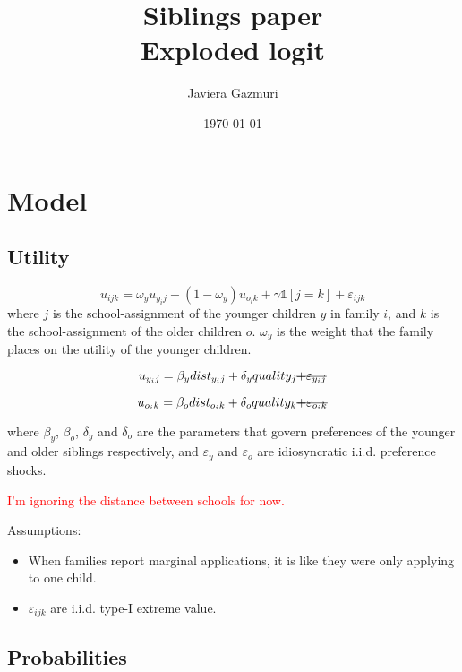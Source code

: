 \documentclass{article}
\title{\textbf{Siblings paper} \\ Exploded logit}
\author{Javiera Gazmuri}
\date{\today}
\newcommand{\stkout}[1]{\ifmmode\text{\sout{\ensuremath{#1}}}\else\sout{#1}\fi}
\begin{document}
\maketitle


\section{Model}

\subsection{Utility}

\begin{equation}
    u_{ijk} = \omega_{y} u_{y_ij} + (1-\omega_{y})u_{o_ik} + \gamma \mathds{1}[j = k] + \varepsilon_{ijk}
\end{equation}
where $j$ is the school-assignment of the younger children $y$ in family $i$, and $k$ is the school-assignment of the older children $o$. $\omega_{y}$ is the weight that the family places on the utility of the younger children. 

\begin{equation}
    u_{y_ij} = \beta_{y} dist_{{y_i}j} + \delta_y quality_j  \stkout{ +  \varepsilon_{y_ij}}
\end{equation}

\begin{equation}
    u_{o_ik} = \beta_{o} dist_{{o_i}k} + \delta_o quality_k  \stkout{+ \varepsilon_{o_ik}}
\end{equation}

where $\beta_y$, $\beta_o$, $\delta_y$ and $\delta_o$ are the parameters that govern preferences of the younger and older siblings respectively, and $\varepsilon_{y}$ and $\varepsilon_{o}$ are idiosyncratic i.i.d. preference shocks.

\textcolor{red}{I'm ignoring the distance between schools for now.}

Assumptions:
\begin{itemize}
    \item When families report marginal applications, it is like they were only applying to one child.
    \item $\varepsilon_{ijk}$ are i.i.d. type-I extreme value.
\end{itemize}

\subsection{Probabilities}
\end{document}
